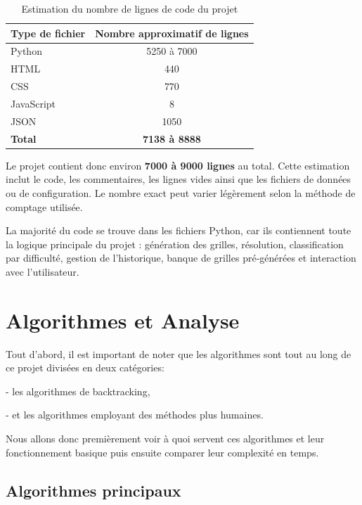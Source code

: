 \documentclass[a4paper]{article}
\begin{document}
\begin{table}[h]
    \centering
    \begin{tabular}{|l|c|}
        \hline
        \textbf{Type de fichier} & \textbf{Nombre approximatif de lignes} \\
        \hline
        Python & 5250 à 7000 \\
        \hline
        HTML & 440 \\
        \hline
        CSS & 770 \\
        \hline
        JavaScript & 8 \\
        \hline
        JSON & 1050 \\
        \hline
        \textbf{Total} & \textbf{7138 à 8888} \\
        \hline
    \end{tabular}
    \caption{Estimation du nombre de lignes de code du projet}
    \label{tab:stats-lignes}
\end{table}

Le projet contient donc environ \textbf{7000 à 9000 lignes} au total. Cette estimation inclut le code, les commentaires, les lignes vides ainsi que les fichiers de données ou de configuration. Le nombre exact peut varier légèrement selon la méthode de comptage utilisée.

La majorité du code se trouve dans les fichiers Python, car ils contiennent toute la logique principale du projet : génération des grilles, résolution, classification par difficulté, gestion de l'historique, banque de grilles pré-générées et interaction avec l'utilisateur.

\section{Algorithmes et Analyse}

Tout d'abord, il est important de noter que les algorithmes sont tout au long de ce projet divisées en deux catégories:

- les algorithmes de backtracking,

- et les algorithmes employant des méthodes plus humaines.

Nous allons donc premièrement voir à quoi servent ces algorithmes et leur fonctionnement basique puis ensuite comparer leur complexité en temps.

\subsection{Algorithmes principaux}
\end{document}

